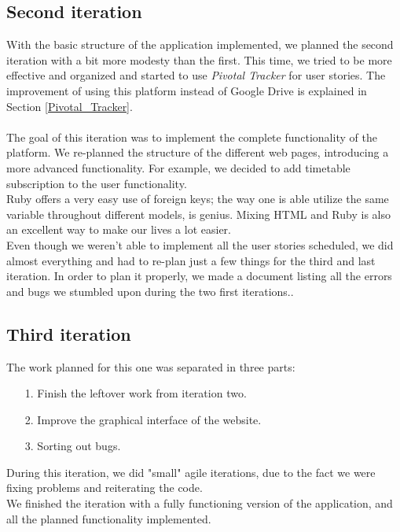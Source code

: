 \subsection{Second iteration}
\vspace{-5mm}
With the basic structure of the application implemented, we planned the second iteration with a bit more modesty than the first. This time, we tried to be more effective and organized and started to use \textit{Pivotal Tracker}\cite{pivotal} for user stories. The improvement of using this platform instead of Google Drive is explained in Section \ref{Pivotal_Tracker}.\\\\
The goal of this iteration was to implement the complete functionality of the platform. We re-planned  the structure of the different web pages, introducing a more advanced functionality. For example, we decided to add timetable subscription to the user functionality.\\
Ruby offers a very easy use of foreign keys; the way one is able utilize the same variable throughout different models, is genius. Mixing HTML and Ruby is also an excellent way to make our lives a lot easier.\\
Even though we weren't able to implement all the user stories scheduled, we did almost everything and had to re-plan just a few things for the third and last iteration. In order to plan it properly, we made a document listing all the errors and bugs we stumbled upon during the two first iterations..

\subsection{Third iteration}
\vspace{-5mm}
The work planned for this one was separated in three parts: 
\vspace{-5mm}
\begin{itemize}\setlength{\itemsep}{-5pt}
	\item[1.] Finish the leftover work from iteration two.
	\item[2.] Improve the graphical interface of the website.
	\item[3.] Sorting out bugs.
\end{itemize}
During this iteration, we did "small" agile iterations, due to the fact we were fixing problems and reiterating the code. \\
We finished the iteration with a fully functioning version of the application, and all the planned functionality implemented.
	
